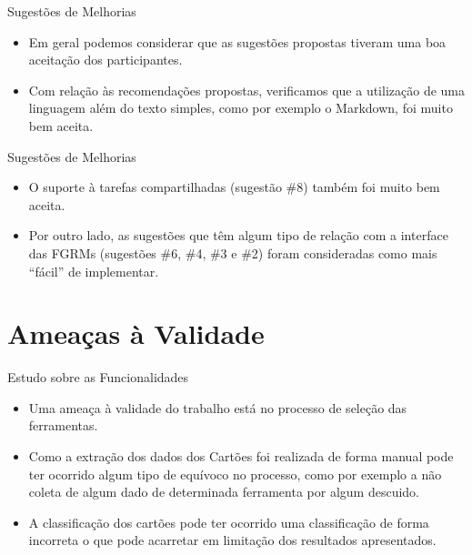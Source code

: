 \documentclass[t,14pt,mathserif]{beamer}
\begin{document}
\begin{frame}{Sugestões de Melhorias}
    \begin{itemize}
        \item Em geral podemos considerar que as sugestões propostas tiveram uma
            boa aceitação dos participantes.
        \item Com relação às recomendações propostas, verificamos que a
            utilização de uma linguagem além do texto simples, como por exemplo
            o Markdown, foi muito bem aceita.
    \end{itemize}
\end{frame}

\begin{frame}{Sugestões de Melhorias}
    \begin{itemize}
        \item O suporte à tarefas compartilhadas (sugestão \#8) também foi muito
            bem aceita.
        \item Por outro lado, as sugestões que têm algum tipo de relação com a
            interface das FGRMs (sugestões \#6, \#4, \#3 e \#2) foram
            consideradas como mais ``fácil'' de implementar.
    \end{itemize}
\end{frame}
\section{Ameaças à Validade}

\begin{frame}{Estudo sobre as Funcionalidades}
    \begin{itemize}
        \item Uma ameaça à validade do trabalho está no processo de seleção das
            ferramentas.
        \item Como a extração dos dados dos Cartões foi realizada de forma
            manual pode ter ocorrido algum tipo de equívoco no processo, como
            por exemplo a não coleta de algum dado de determinada ferramenta por
            algum descuido.
        \item A classificação dos cartões pode ter ocorrido uma classificação de
            forma incorreta o que pode acarretar em limitação dos resultados
            apresentados.
    \end{itemize}

\end{frame}
\end{document}
